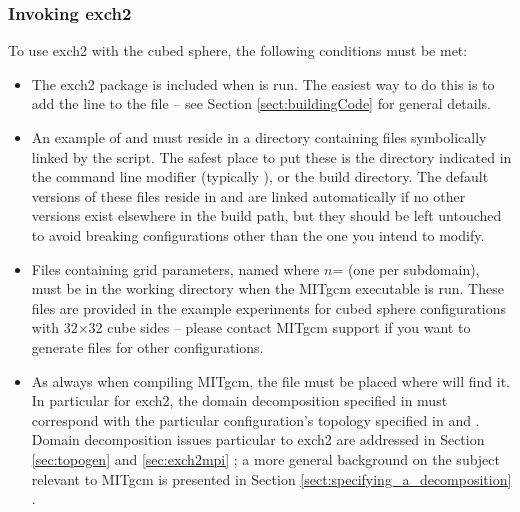 \subsubsection{Invoking exch2}

To use exch2 with the cubed sphere, the following conditions must be
met:

\begin{itemize}
\item The exch2 package is included when  is run.  The
  easiest way to do this is to add the line  to the
   file -- see Section \ref{sect:buildingCode}
   for general
  details.

\item An example of  and
   must reside in a directory containing files
  symbolically linked by the  script.  The safest place
  to put these is the directory indicated in the 
  command line modifier (typically ), or the build
  directory.  The default versions of these files reside in
   and are linked automatically if no other versions
  exist elsewhere in the build path, but they should be left untouched
  to avoid breaking configurations other than the one you intend to
  modify.

\item Files containing grid parameters, named 
  where $n$= (one per subdomain), must be in the working
  directory when the MITgcm executable is run.  These files are
  provided in the example experiments for cubed sphere configurations
  with 32$\times$32 cube sides -- please contact MITgcm support if you
  want to generate files for other configurations.

\item As always when compiling MITgcm, the file  must be
  placed where  will find it.  In particular for exch2,
  the domain decomposition specified in  must correspond
  with the particular configuration's topology specified in
   and .  Domain
  decomposition issues particular to exch2 are addressed in Section
  \ref{sec:topogen} 
  and \ref{sec:exch2mpi} ; a more general background on the subject
  relevant to MITgcm is presented in Section
  \ref{sect:specifying_a_decomposition}
  .
\end{itemize}

